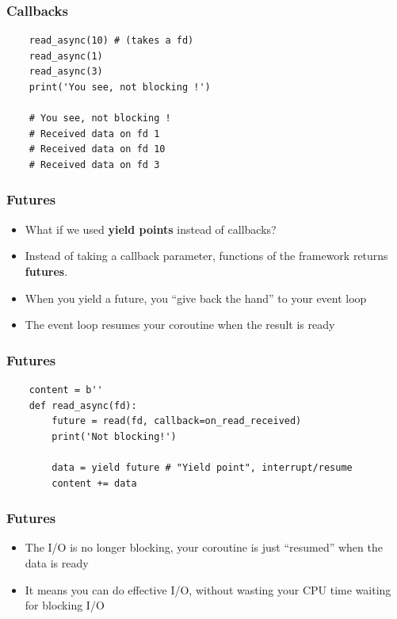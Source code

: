 \documentclass[ignorenonframetext,]{beamer}
\begin{document}
\begin{frame}[fragile]\frametitle{Callbacks}

\begin{verbatim}
    read_async(10) # (takes a fd)
    read_async(1)
    read_async(3)
    print('You see, not blocking !')

    # You see, not blocking !
    # Received data on fd 1
    # Received data on fd 10
    # Received data on fd 3
\end{verbatim}

\end{frame}

\begin{frame}[fragile]\frametitle{Futures}

\begin{itemize}
\itemsep1pt\parskip0pt
\item
  What if we used \textbf{yield points} instead of callbacks?
\item
  Instead of taking a callback parameter, functions of the framework
  returns \textbf{futures}.
\item
  When you yield a future, you ``give back the hand'' to your event loop
\item
  The event loop resumes your coroutine when the result is ready
\end{itemize}

\end{frame}

\begin{frame}[fragile]\frametitle{Futures}

\begin{verbatim}
    content = b''
    def read_async(fd):
        future = read(fd, callback=on_read_received)
        print('Not blocking!')

        data = yield future # "Yield point", interrupt/resume
        content += data
\end{verbatim}

\end{frame}

\begin{frame}[fragile]\frametitle{Futures}

\begin{itemize}
\itemsep1pt\parskip0pt
\item
  The I/O is no longer blocking, your coroutine is just ``resumed'' when
  the data is ready
\item
  It means you can do effective I/O, without wasting your CPU time
  waiting for blocking I/O
\end{itemize}

\end{frame}
\end{document}
